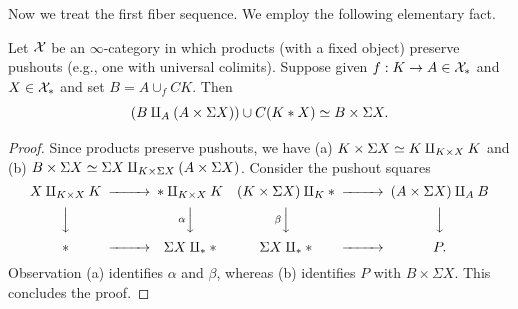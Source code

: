\documentclass{amsart}
\numberwithin{proposition}{section}
\numberwithin{equation}{section}
\begin{document}
Now we treat the first fiber sequence.
We employ the following elementary fact.
\begin{lemma} \label{lem:cone-elem}
Let $\mathcal X$ be an $\infty$-category in which products (with a fixed object) preserve pushouts (e.g., one with universal colimits).
Suppose given $f: K \to A \in \mathcal X_*$ and $X \in \mathcal X_*$ and set $B = A \cup_f CK$.
Then \[ (B \amalg_A (A \times \Sigma X)) \cup C(K * X) \simeq B \times \Sigma X. \]
\end{lemma}
\begin{proof}
Since products preserve pushouts, we have (a) $K \times \Sigma X \simeq K \amalg_{K \times X} K$ and (b) $B \times \Sigma X \simeq \Sigma X \amalg_{K \times \Sigma X} (A \times \Sigma X)$.
Consider the pushout squares
\begin{equation*}
\begin{CD}
X \amalg_{K \times X} K @>>> * \amalg_{K \times X} K @. \quad @. (K \times \Sigma X) \amalg_K * @>>> (A \times \Sigma X) \amalg_A B \\
@VVV                         @V{\alpha}VV                         @.        @V{\beta}VV                                       @VVV \\
* @>>>                        \Sigma X \amalg_* *    @.       @.  \Sigma X \amalg_* * @>>> P.
\end{CD}
\end{equation*}
Observation (a) identifies $\alpha$ and $\beta$, whereas (b) identifies $P$ with $B \times \Sigma X$.
This concludes the proof.
\end{proof}
\end{document}
